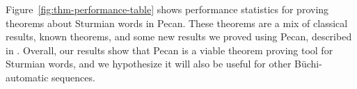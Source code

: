 Figure~\ref{fig:thm-performance-table} shows performance statistics for proving theorems about Sturmian words in Pecan.
These theorems are a mix of classical results, known theorems, and some new results we proved using Pecan, described in \cite{DecStuWor}.
Overall, our results show that Pecan is a viable theorem proving tool for Sturmian words, and we hypothesize it will also be useful for other B\"uchi-automatic sequences.
